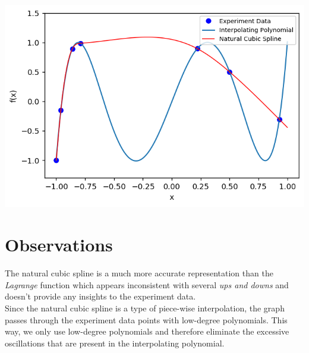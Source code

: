 \documentclass{article}
\begin{document}
\includegraphics[width=\textwidth,height=\textheight,keepaspectratio]{together.png}

\section{Observations}
The natural cubic spline is a much more accurate representation than the {\it Lagrange} function which appears inconsistent with several {\it ups and downs} and doesn't provide any insights to the experiment data.\\

Since the natural cubic spline is a type of piece-wise interpolation, the graph passes through the experiment data points with low-degree polynomials. This way, we only use low-degree polynomials and therefore eliminate the excessive oscillations that are present in the interpolating polynomial.
\end{document}
